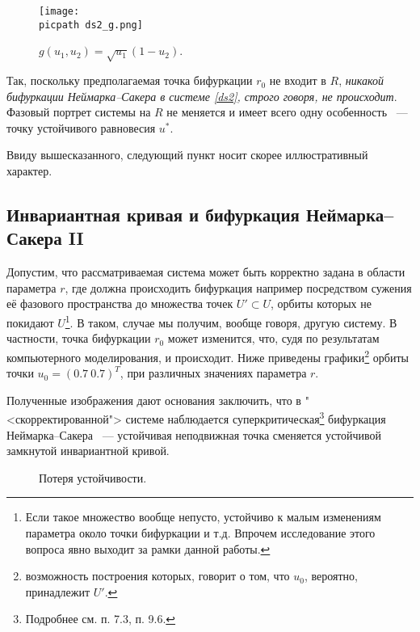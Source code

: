 \documentclass[oneside,final,12pt]{article}
\newcommand*\bigpicsize{0.7\textwidth}
\newcommand*\subpicsize{0.45\textwidth}
\newcommand*\picpath{pictures/}
\theoremstyle{plain}
\theoremstyle{remark}
\theoremstyle{definition}
\theoremstyle{plain}
\begin{document}
		\begin{figure}[!h]
			\centering
			\texttt{[image: \\picpath ds2\_g.png]}
			\caption{\(g(u_1,u_2) = \sqrt{u_1} (1-u_2)\).}\label{pic_ds2_g} 
		\end{figure}

	\newpage

		Так, поскольку предполагаемая точка бифуркации \(r_0\) не входит в \(R\), \emph{никакой бифуркации Неймарка--Сакера в системе \eqref{ds2}, строго говоря, не происходит}. Фазовый портрет системы на \(R\) не меняется и имеет всего одну особенность ~--- точку устойчивого равновесия \(u^*\). 

	\bigskip

		Ввиду вышесказанного, следующий пункт носит скорее иллюстративный характер.
		
	\subsection{Инвариантная кривая и бифуркация Неймарка--Сакера II}			

		Допустим, что рассматриваемая система может быть корректно задана в области параметра \(r\), где должна происходить бифуркация например посредством сужения её фазового пространства до множества точек \(U' \subset U\), орбиты которых не покидают \(U\)\footnote{Если такое множество вообще непусто, устойчиво к малым изменениям параметра около точки бифуркации и т.д. Впрочем исследование этого вопроса явно выходит за рамки данной работы.}. В таком, случае мы получим, вообще говоря, другую систему. В частности, точка бифуркации \(r_0\) может изменится, что, судя по результатам компьютерного моделирования, и происходит. Ниже приведены графики\footnote{возможность построения которых, говорит о том, что \(u_0\), вероятно, принадлежит \(U'\).} орбиты точки \(u_0 = (0.7 \: 0.7)^T\), при различных значениях параметра \(r\).

		Полученные изображения дают основания заключить, что в "<скорректированной"> системе наблюдается суперкритическая\footnote{Подробнее см. \cite{DSMB} п. 7.3, п. 9.6.} бифуркация Неймарка--Сакера ~--- устойчивая неподвижная точка сменяется устойчивой замкнутой инвариантной кривой.

		\begin{figure}[!h]
			\centering
			\qquad
			\caption{Потеря устойчивости.}
		\end{figure}
\end{document}
